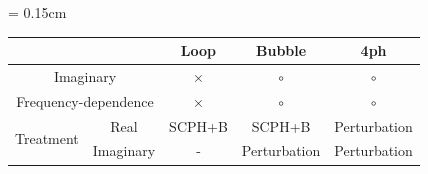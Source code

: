 \documentclass[multi=tabular]{standalone}
\begin{document}
 \renewcommand{\arraystretch}{1.8}
 {\tabcolsep = 0.15cm
  \begin{tabular}{lcccc}
   \hline\hline
    && Loop  & Bubble & 4ph    \\
   \hline 
  \multicolumn{2}{c}{Imaginary}          & × & $\circ$ & $\circ$  \\ 
   \multicolumn{2}{c}{Frequency-dependence} & × & $\circ$ & $\circ$  \\
   \multirow{2}{*}{Treatment}& Real       & SCPH+B & SCPH+B       & Perturbation \\ 
                             & Imaginary  & -    & Perturbation & Perturbation  \\ 
    \hline
   \hline
  \end{tabular}
}

\renewcommand{\arraystretch}{1.0}
\end{document}
